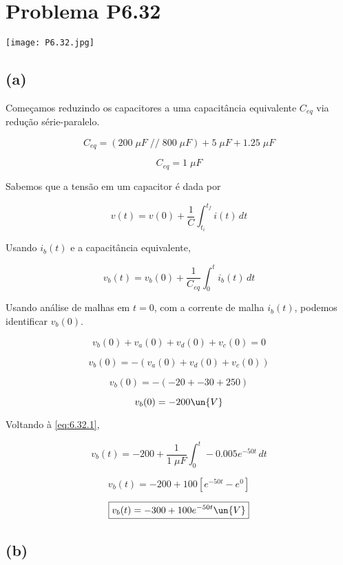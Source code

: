 
\section*{Problema P6.32}

\renewcommand*\thesection{6.32}

\begin{center}
    \texttt{[image: P6.32.jpg]}
\end{center}

\subsection*{(a)}

Começamos reduzindo os capacitores a uma capacitância equivalente $C_{eq}$ via redução série-paralelo. 

\[ C_{eq} = (200 \;\mu F \; // \; 800 \;\mu F) + 5 \;\mu F + 1.25 \;\mu F  \]

\[ C_{eq} = 1 \;\mu F  \]

Sabemos que a tensão em um capacitor é dada por

\begin{equation}\label{eq:6.32.1}
    v(t) = v(0) + \frac{1}{C} \int_{t_i}^{t_f} i(t) \,dt
\end{equation}

Usando $i_b(t)$ e a capacitância equivalente, 

\[ v_b(t) = v_b(0) + \frac{1}{C_{eq}} \int_{0}^{t} i_b(t) \,dt \]

Usando análise de malhas em $t=0$, com a corrente de malha $i_b(t)$, podemos identificar $v_b(0)$.

\[ v_b(0) + v_a(0) + v_d(0) + v_c(0) = 0\]

\[ v_b(0) = - (v_a(0) + v_d(0) + v_c(0)) \]

\[ v_b(0) = - (-20 + -30 + 250) \]

\[ v_b(0) = - 200 \un{V} \]

Voltando à \eqref{eq:6.32.1},

\[ v_b(t) = -200 + \frac{1}{1 \;\mu F } \int_{0}^{t} -0.005e^{-50t} \,dt \]

\[ v_b(t) = -200 + 100\left[e^{-50t} - e^0\right] \]

\[ \boxed{v_b(t) = -300 + 100e^{-50t} \un{V}}  \]

\subsection*{(b)}

